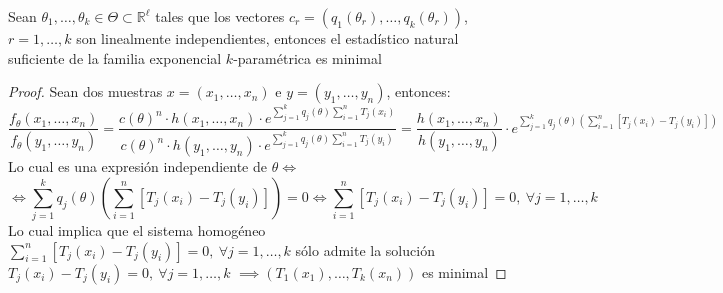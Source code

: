 \begin{teorema}
  Sean $\theta_1, \ldots, \theta_k \in \Theta \subset \mathbb{R}^{\ell}$ tales que los vectores $c_r = (q_1(\theta_r), \ldots, q_k(\theta_r))$, $r = 1, \ldots, k$ son linealmente independientes, entonces el estadístico natural suficiente de la familia exponencial $k$-paramétrica es minimal
\end{teorema}

\begin{proof}
  Sean dos muestras $x = (x_1, \ldots, x_n)$ e $y = (y_1, \ldots, y_n)$, entonces:
  $$\frac{f_{\theta}(x_1, \ldots, x_n)}{f_{\theta}(y_1, \ldots, y_n)} = \frac{c(\theta)^n \cdot h(x_1, \ldots, x_n) \cdot e^{\sum_{j = 1}^{k}q_j(\theta)\sum_{i = 1}^{n}T_j(x_i)}}{c(\theta)^n \cdot h(y_1, \ldots, y_n) \cdot e^{\sum_{j = 1}^{k}q_j(\theta)\sum_{i = 1}^{n}T_j(y_i)}} = \frac{h(x_1, \ldots, x_n)}{h(y_1, \ldots, y_n)} \cdot e^{\sum_{j = 1}^{k}q_j(\theta)\left(\sum_{i = 1}^{n}[T_j(x_i) - T_j(y_i)]\right)}$$
  Lo cual es una expresión independiente de $\theta \iff$
  $$\iff \sum_{j = 1}^{k}q_j(\theta)\left(\sum_{i = 1}^{n}[T_j(x_i) - T_j(y_i)]\right) = 0 \iff \sum_{i = 1}^{n}[T_j(x_i) - T_j(y_i)] = 0, \ \forall j = 1, \ldots, k$$
  Lo cual implica que el sistema homogéneo $\sum_{i = 1}^{n}[T_j(x_i) - T_j(y_i)] = 0, \ \forall j = 1, \ldots, k$ sólo admite la solución $T_j(x_i) - T_j(y_i) = 0, \ \forall j = 1, \ldots, k$ $\implies (T_1(x_1), \ldots, T_k(x_n))$ es minimal
\end{proof}

